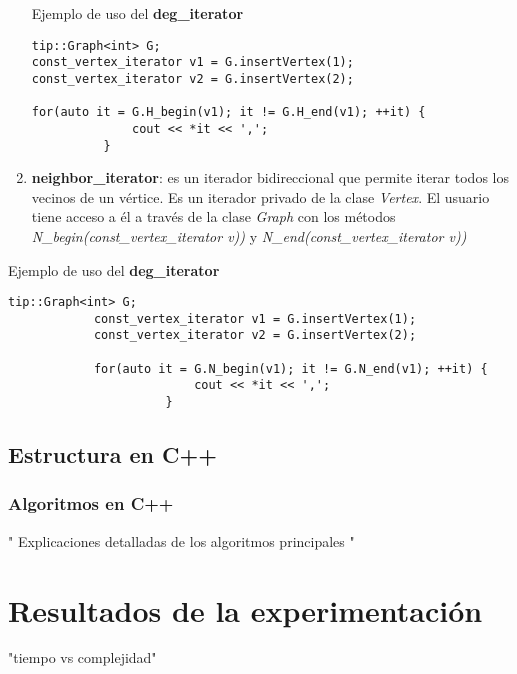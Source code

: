 \documentclass[a4paper,12pt]{article}
\begin{document}
\begin{enumerate}
Ejemplo de uso del \textbf{deg\_iterator}

\begin{lstlisting}[frame=single]
tip::Graph<int> G;
const_vertex_iterator v1 = G.insertVertex(1);
const_vertex_iterator v2 = G.insertVertex(2);

for(auto it = G.H_begin(v1); it != G.H_end(v1); ++it) {
              cout << *it << ',';
          }
\end{lstlisting}


\item \textbf{neighbor\_iterator}: es un iterador bidireccional que permite iterar todos los vecinos de un vértice. Es un iterador privado de la clase \textit{Vertex}. El usuario tiene acceso a él a través de la clase \textit{Graph} con los métodos \textit{N\_begin(const\_vertex\_iterator v))} y \textit{N\_end(const\_vertex\_iterator v))}
\end{enumerate}
                        Ejemplo de uso del \textbf{deg\_iterator}

            \begin{lstlisting}[frame=single]
            tip::Graph<int> G;
            const_vertex_iterator v1 = G.insertVertex(1);
            const_vertex_iterator v2 = G.insertVertex(2);

            for(auto it = G.N_begin(v1); it != G.N_end(v1); ++it) {
                          cout << *it << ',';
                      }
            \end{lstlisting}



\subsection{Estructura en C++}




\subsubsection{Algoritmos en C++}
" Explicaciones detalladas de los algoritmos principales "


\section{Resultados de la experimentación}
\label{sec5}
"tiempo vs complejidad"
\end{document}
